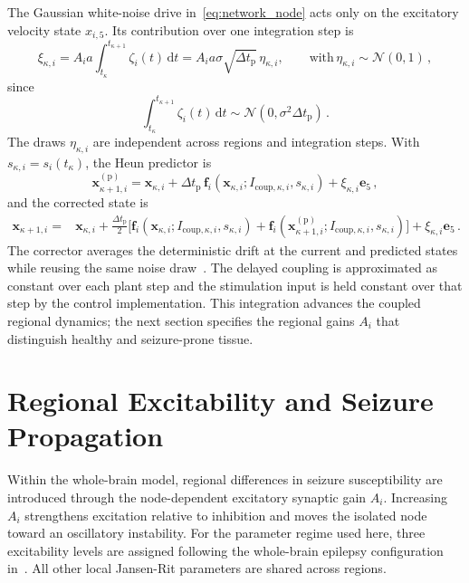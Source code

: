 The Gaussian white-noise drive in~\eqref{eq:network_node} acts only on the excitatory velocity state $x_{i,5}$.
Its contribution over one integration step is
%
\begin{equation*}
    \xi_{\kappa,i}
    =A_i a\int_{t_\kappa}^{t_{\kappa+1}}\zeta_i(t)\,\mathrm{d}t
    =A_i a\sigma\sqrt{\Delta t_\mathrm{p}}\,\eta_{\kappa,i},
    \qquad
    \text{with}\,\eta_{\kappa,i}\sim\mathcal{N}(0, 1)\,,
\end{equation*}
%
since
%
\begin{equation*}
    \int_{t_\kappa}^{t_{\kappa+1}}\zeta_i(t)\,\mathrm{d}t
    \sim
    \mathcal{N}\!\left(0, \sigma^2\Delta t_\mathrm{p}\right)\,.
\end{equation*}
%
The draws $\eta_{\kappa,i}$ are independent across regions and integration steps.
With $s_{\kappa,i}=s_i(t_\kappa)$, the Heun predictor is
%
\begin{equation*}
    \mathbf{x}^{(\mathrm{p})}_{\kappa+1,i}
    =\mathbf{x}_{\kappa,i}
    +\Delta t_\mathrm{p}\,
      \mathbf{f}_i\!\left(\mathbf{x}_{\kappa,i};I_{\mathrm{coup},\kappa,i},s_{\kappa,i}\right)
      +\xi_{\kappa,i}\mathbf{e}_5\,,
\end{equation*}
%
and the corrected state is
%
\begin{align*}
    \mathbf{x}_{\kappa+1,i}
    ={}&\mathbf{x}_{\kappa,i}
    +\frac{\Delta t_\mathrm{p}}{2}
      \Big[
      \mathbf{f}_i\!\left(\mathbf{x}_{\kappa,i};I_{\mathrm{coup},\kappa,i},s_{\kappa,i}\right)
      +\mathbf{f}_i\!\left(\mathbf{x}^{(\mathrm{p})}_{\kappa+1,i};I_{\mathrm{coup},\kappa,i},s_{\kappa,i}\right)
      \Big]
      +\xi_{\kappa,i}\mathbf{e}_5\,.
\end{align*}
%
The corrector averages the deterministic drift at the current and predicted states while reusing the same noise draw~\cite{SanzLeon2015}.
The delayed coupling is approximated as constant over each plant step and the stimulation input is held constant over that step by the control implementation.
This integration advances the coupled regional dynamics; the next section specifies the regional gains $A_i$ that distinguish healthy and seizure-prone tissue.


\section{Regional Excitability and Seizure Propagation}
\label{sec:parameter_selection}

Within the whole-brain model, regional differences in seizure susceptibility are introduced through the node-dependent excitatory synaptic gain $A_i$.
Increasing $A_i$ strengthens excitation relative to inhibition and moves the isolated node toward an oscillatory instability.
For the parameter regime used here, three excitability levels are assigned following the whole-brain epilepsy configuration in~\cite{Yu2024}.
All other local Jansen-Rit parameters are shared across regions.

